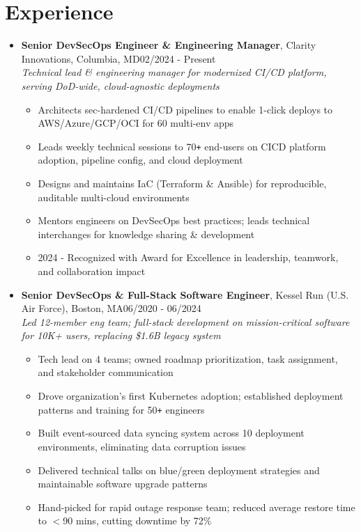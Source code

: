 \documentclass{article}
\begin{document}
\section{Experience} 
\begin{itemize}
    \itemsep0.2em
    \item \textbf{Senior DevSecOps Engineer \& Engineering Manager}, Clarity Innovations, Columbia, MD\hfill 02/2024 - Present \\ \emph{ Technical lead \& engineering manager for modernized CI/CD platform, serving DoD-wide, cloud-agnostic deployments}
    \begin{itemize}
        \itemsep0em
        \item Architects sec-hardened CI/CD pipelines to enable 1-click deploys to AWS/Azure/GCP/OCI for 60 multi-env apps
        \item Leads weekly technical sessions to 70\verb!+! end-users on CICD platform adoption, pipeline config, and cloud deployment
        \item Designs and maintains IaC (Terraform \& Ansible) for reproducible, auditable multi-cloud environments
        \item Mentors engineers on DevSecOps best practices; leads technical interchanges for knowledge sharing \& development
        \item 2024 - Recognized with Award for Excellence in leadership, teamwork, and collaboration impact
    \end{itemize}
    
    \item \textbf{Senior DevSecOps \& Full-Stack Software Engineer}, Kessel Run (U.S. Air Force), Boston, MA\hfill 06/2020 - 06/2024 \\ \emph{Led 12-member eng team; full-stack development on mission-critical software for 10K+ users, replacing \$1.6B legacy system}
    \begin{itemize}
        \itemsep0em
        \item Tech lead on 4 teams; owned roadmap prioritization, task assignment, and stakeholder communication
        \item Drove organization's first Kubernetes adoption; established deployment patterns and training for 50\verb!+! engineers
        \item Built event-sourced data syncing system across 10 deployment environments, eliminating data corruption issues
        \item Delivered technical talks on blue/green deployment strategies and maintainable software upgrade patterns
        \item Hand-picked for rapid outage response team; reduced average restore time to $<$90 mins, cutting downtime by 72\%
    \end{itemize}
    

\end{itemize}
\end{document}
